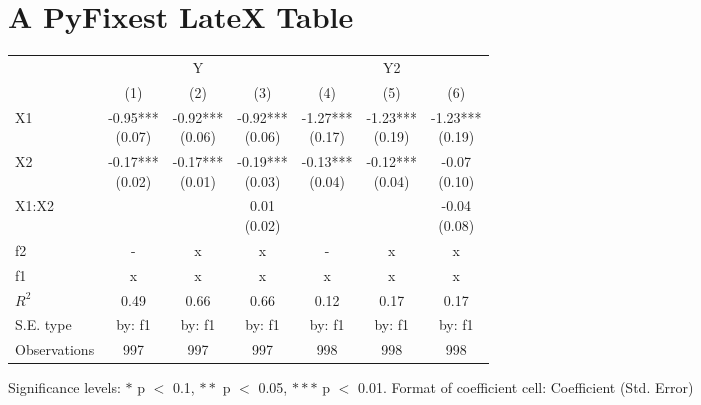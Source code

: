 \documentclass{article}%
\begin{document}
%
\normalsize%
\section{A PyFixest LateX Table}%
\label{sec:APyFixestLateXTable}%


\begin{table}[htbp]%
\renewcommand\cellalign{t}
\begin{threeparttable}
\begin{tabular}{lcccccc}
\toprule
 & \multicolumn{3}{c}{Y} & \multicolumn{3}{c}{Y2} \\
\cmidrule(lr){2-4} \cmidrule(lr){5-7} 
 & (1) & (2) & (3) & (4) & (5) & (6) \\
\midrule
X1 & \makecell{-0.95*** \\ (0.07)} & \makecell{-0.92*** \\ (0.06)} & \makecell{-0.92*** \\ (0.06)} & \makecell{-1.27*** \\ (0.17)} & \makecell{-1.23*** \\ (0.19)} & \makecell{-1.23*** \\ (0.19)} \\
X2 & \makecell{-0.17*** \\ (0.02)} & \makecell{-0.17*** \\ (0.01)} & \makecell{-0.19*** \\ (0.03)} & \makecell{-0.13*** \\ (0.04)} & \makecell{-0.12*** \\ (0.04)} & \makecell{-0.07 \\ (0.10)} \\
X1:X2 &  &  & \makecell{0.01 \\ (0.02)} &  &  & \makecell{-0.04 \\ (0.08)} \\
\midrule
f2 & - & x & x & - & x & x \\
f1 & x & x & x & x & x & x \\
\midrule
$R^2$ & 0.49 & 0.66 & 0.66 & 0.12 & 0.17 & 0.17 \\
S.E. type & by: f1 & by: f1 & by: f1 & by: f1 & by: f1 & by: f1 \\
Observations & 997 & 997 & 997 & 998 & 998 & 998 \\
\bottomrule
\end{tabular}
\footnotesize Significance levels: $*$ p $<$ 0.1, $**$ p $<$ 0.05, $***$ p $<$ 0.01. Format of coefficient cell: Coefficient 
 (Std. Error)
\end{threeparttable}%
\end{table}

%
\end{document}

